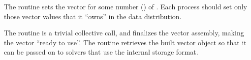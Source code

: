 The  routine sets the vector  for some
number () of .  Each process should set
only those vector values that it ``owns'' in the data distribution.

The  routine is a trivial collective call, and
finalizes the vector assembly, making the vector ``ready to use''.
The  routine retrieves the built vector object so
that it can be passed on to \hypre{} solvers that use the
 internal storage format.
